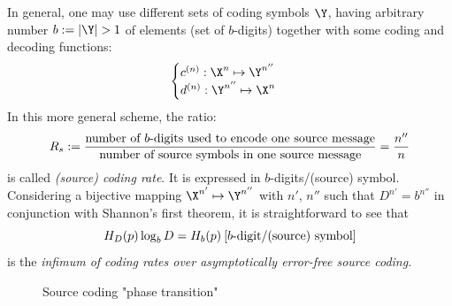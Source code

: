 \documentclass[toc, titlepaged]{../cs-classes/cs-classes}
\begin{document}
\begin{remark}
    In general, one may use different sets of coding symbols $\Y$, having arbitrary number $b:=|\Y|>1$ of elements (set of $b$-digits) together with some coding and decoding functions:
    \begin{equation*}
        \begin{cases}
            c^{(n)}:\X^n\mapsto \Y^{n''}\\
            d^{(n)}:\Y^{n''}\mapsto \X^n
        \end{cases}
    \end{equation*}
    In this more general scheme, the ratio:
    \begin{equation}
        R_s:=\frac{\textnormal{number of $b$-digits used to encode one source message}}{\textnormal{number of source symbols in one source message}} = \frac{n''}{n}
    \end{equation}
    is called \emph{(source) coding rate}. It is expressed in $b$-digits/(source) symbol. Considering a bijective mapping $\X^{n'}\mapsto \Y^{n''}$ with $n'$, $n''$ such that $D^{n'}=b^{n''}$ in conjunction with Shannon's first theorem, it is straightforward to see that
    \begin{equation*}
        H_D(p)\log_bD = H_b(p) \: \textnormal{[$b$-digit/(source) symbol]}
    \end{equation*}
    is the \emph{infimum of coding rates over asymptotically error-free source coding}.
    \begin{figure}[!ht]
        \center
        \caption{Source coding "phase transition"}
    \end{figure}
\end{remark}
\end{document}

